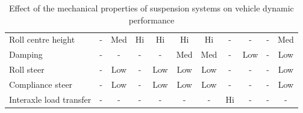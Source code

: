 \begin{table}[H]
\begin{threeparttable}
\begin{tabulary}{\textwidth}{lcccccccccc}
            Roll centre height & -     & Med   & Hi    & Hi    & Hi    & Hi    & -     & -     & -     & Med \\
            Damping & -     & -     & -     & -     & Med   & Med   & -     & Low   & -     & Low \\
            Roll steer & -     & Low   & -     & Low   & Low   & Low   & -     & -     & -     & Low \\
            Compliance steer & -     & Low   & -     & Low   & Low   & Low   & -     & -     & -     & Low \\
            Interaxle load transfer & -     & -     & -     & -     & -     & -     & Hi    & -     & -     & -\\
            \bottomrule
		\end{tabulary}

		\caption{Effect of the mechanical properties of suspension systems on vehicle dynamic performance \cite{Fancher1986}}
		\label{table:effect-of-the-mechanical-properties-of-suspensions-on-vehicle-dynamic-performance}

	\end{threeparttable}
\end{table}

